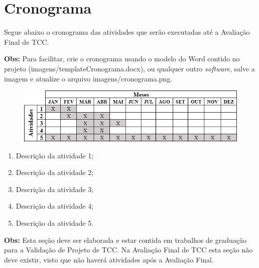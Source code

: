 \documentclass[
	article,
	11pt,
	oneside,
	a4paper,
	chapter=TITLE,
	section=TITLE,
	english,
	brazil,
	sumario=tradicional
]{abntex2}
\begin{document}

	\section{Cronograma}
	
	Segue abaixo o cronograma das atividades que serão executadas até a Avaliação Final de TCC.
	
	\textbf{Obs:} Para facilitar, crie o cronograma usando o modelo do Word contido no projeto (imagens/templateCronograma.docx), ou qualquer outro \textit{software}, salve a imagem e atualize o arquivo imagens/cronograma.png.
	
	\FloatBarrier
	\begin{figure}[!htbp]
		\centering
		\includegraphics[scale=1]{imagens/cronograma}
	\end{figure}
	\FloatBarrier
	
	\begin{enumerate}
		\item Descrição da atividade 1;
		\item Descrição da atividade 2;
		\item Descrição da atividade 3;
		\item Descrição da atividade 4;
		\item Descrição da atividade 5.
	\end{enumerate}
	
	\textbf{Obs:} Esta seção deve ser elaborada e estar contida em trabalhos de graduação para a Validação de Projeto de TCC. Na Avaliação Final de TCC esta seção não deve existir, visto que não haverá atividades após a Avaliação Final.
	
	
	\postextual
	
	
    \begin{folhadeaprovacao}
    	
    \end{folhadeaprovacao}
\end{document}
